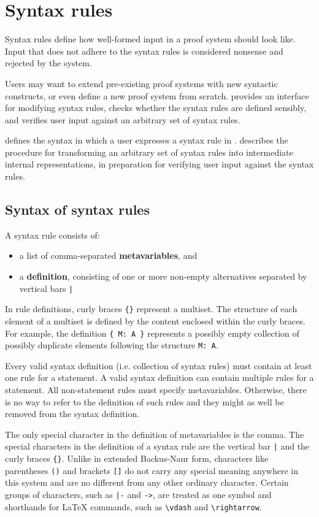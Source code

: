 \section{Syntax rules}
\label{section:syntax}
Syntax rules define how well-formed input in a proof system should look like. Input that does not adhere to the syntax rules is considered nonsense and rejected by the system.

Users may want to extend pre-existing proof systems with new syntactic constructs, or even define a new proof system from scratch. \projectname{} provides an interface for modifying syntax rules, checks whether the syntax rules are defined sensibly, and verifies user input against an arbitrary set of syntax rules.

 defines the syntax in which a user expresses a syntax rule in \projectname{}.  describes the procedure for transforming an arbitrary set of syntax rules into intermediate internal representations, in preparation for verifying user input against the syntax rules.

\subsection{Syntax of syntax rules}
\label{syntax:syntax}
A syntax rule consists of:
\begin{itemize}
    \item a list of comma-separated \textbf{metavariables}, and
    \item a \textbf{definition}, consisting of one or more non-empty alternatives separated by vertical bars \lstinline{|}
\end{itemize}
In rule definitions, curly braces \lstinline|{}| represent a multiset. The structure of each element of a multiset is defined by the content enclosed within the curly braces. For example, the definition \lstinline|{ M: A }| represents a possibly empty collection of possibly duplicate elements following the structure \lstinline{M: A}.

Every valid syntax definition (i.e. collection of syntax rules) must contain at least one rule for a statement. A valid syntax definition can contain multiple rules for a statement. All non-statement rules must specify metavariables. Otherwise, there is no way to refer to the definition of such rules and they might as well be removed from the syntax definition.

The only special character in the definition of metavariables is the comma. The special characters in the definition of a syntax rule are the vertical bar \lstinline{|} and the curly braces \lstinline|{}|. Unlike in extended Backus-Naur form, characters like parentheses \lstinline{()} and brackets \lstinline{[]} do not carry any special meaning anywhere in this system and are no different from any other ordinary character. Certain groups of characters, such as \lstinline{|-} and \lstinline{->}, are treated as one symbol and shorthands for \LaTeX{} commands, such as \lstinline{\vdash} and \lstinline{\rightarrow}.


